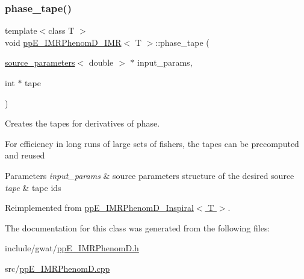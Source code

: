 \subsubsection{\texorpdfstring{phase\+\_\+tape()}{phase\_tape()}}
{\footnotesize\ttfamily template$<$class T $>$ \\
void \hyperlink{classppE__IMRPhenomD__IMR}{pp\+E\+\_\+\+I\+M\+R\+Phenom\+D\+\_\+\+I\+MR}$<$ T $>$\+::phase\+\_\+tape (\begin{DoxyParamCaption}\item[{\hyperlink{structsource__parameters}{source\+\_\+parameters}$<$ double $>$ $\ast$}]{input\+\_\+params,  }\item[{int $\ast$}]{tape }\end{DoxyParamCaption})\hspace{0.3cm}{\ttfamily [virtual]}}



Creates the tapes for derivatives of phase. 

For efficiency in long runs of large sets of fishers, the tapes can be precomputed and reused 
\begin{DoxyParams}{Parameters}
{\em input\+\_\+params} & source parameters structure of the desired source \\
\hline
{\em tape} & tape ids \\
\hline
\end{DoxyParams}


Reimplemented from \hyperlink{classppE__IMRPhenomD__Inspiral_a2fb1a8fb66e4204dbe397b792933afbe}{pp\+E\+\_\+\+I\+M\+R\+Phenom\+D\+\_\+\+Inspiral$<$ T $>$}.



The documentation for this class was generated from the following files\+:\begin{DoxyCompactItemize}
\item 
include/gwat/\hyperlink{ppE__IMRPhenomD_8h}{pp\+E\+\_\+\+I\+M\+R\+Phenom\+D.\+h}\item 
src/\hyperlink{ppE__IMRPhenomD_8cpp}{pp\+E\+\_\+\+I\+M\+R\+Phenom\+D.\+cpp}\end{DoxyCompactItemize}
